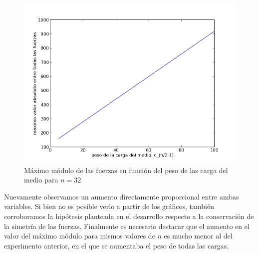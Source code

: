 \begin{figure}[!h]
	\begin{center}
		  \includegraphics[scale=0.4]{Imagenes/variable_cis/just_middle_ci/just_middle_ci_n_32}
		  \caption{Máximo módulo de las fuerzas en función del peso de las carga del medio para $n=32$}
		  \label{fig:contra1}
	\end{center}
\end{figure}

Nuevamente observamos un aumento directamente proporcional entre ambas variables. Si bien no es posible verlo a partir de
los gráficos, también corroboramos la hipótesis planteada en el desarrollo respecto a la conservación de la
simetría de las fuerzas. Finalmente es necesario destacar que el aumento en el 
valor del máximo módulo para mismos valores de $n$ es mucho menor al del experimento anterior, en el que se aumentaba
el peso de todas las cargas.












